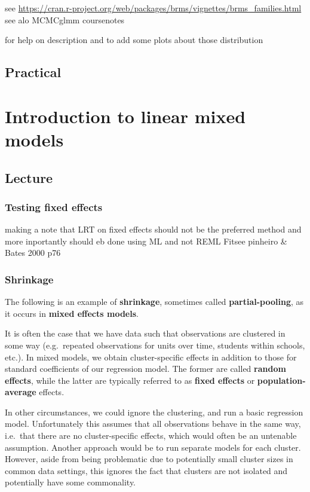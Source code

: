 \documentclass[
  12pt,
]{book}
\begin{document}
see \url{https://cran.r-project.org/web/packages/brms/vignettes/brms_families.html}
see alo MCMCglmm coursenotes

for help on description and to add some plots about those distribution

\hypertarget{practical-2}{%
\section{Practical}\label{practical-2}}

\hypertarget{introduction-to-linear-mixed-models}{%
\chapter{Introduction to linear mixed models}\label{introduction-to-linear-mixed-models}}

\hypertarget{lecture-4}{%
\section{Lecture}\label{lecture-4}}

\hypertarget{testing-fixed-effects}{%
\subsection{Testing fixed effects}\label{testing-fixed-effects}}

making a note that LRT on fixed effects should not be the preferred method and more inportantly should eb done using ML and not REML Fitsee pinheiro \& Bates
2000 p76

\hypertarget{shrinkage}{%
\subsection{Shrinkage}\label{shrinkage}}

The following is an example of \textbf{shrinkage}, sometimes called \textbf{partial-pooling}, as it occurs in \textbf{mixed effects models}.

It is often the case that we have data such that observations are clustered in some way (e.g.~repeated observations for units over time, students within schools, etc.). In mixed models, we obtain cluster-specific effects in addition to those for standard coefficients of our regression model. The former are called \textbf{random effects}, while the latter are typically referred to as \textbf{fixed effects} or \textbf{population-average} effects.

In other circumstances, we could ignore the clustering, and run a basic regression model. Unfortunately this assumes that all observations behave in the same way, i.e.~that there are no cluster-specific effects, which would often be an untenable assumption. Another approach would be to run separate models for each cluster. However, aside from being problematic due to potentially small cluster sizes in common data settings, this ignores the fact that clusters are not isolated and potentially have some commonality.
\end{document}
